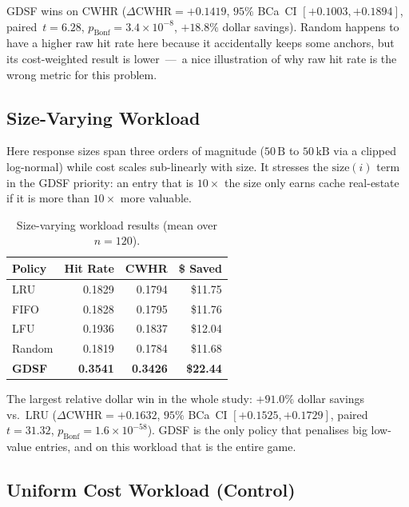 \documentclass[sigconf, nonacm, review=false, screen=true]{acmart}
\begin{document}
GDSF wins on CWHR ($\Delta\text{CWHR} = +0.1419$, $95\%$ BCa~CI
$[+0.1003, +0.1894]$, paired~$t = 6.28$,
$p_{\text{Bonf}} = 3.4\!\times\!10^{-8}$, $+18.8\%$ dollar savings).
Random happens to have a higher raw hit rate here because it accidentally
keeps some anchors, but its cost-weighted result is lower~---~a nice
illustration of why raw hit rate is the wrong metric for this problem.

\subsection{Size-Varying Workload}
Here response sizes span three orders of magnitude ($50\,\text{B}$ to
$50\,\text{kB}$ via a clipped log-normal) while cost scales sub-linearly
with size. It stresses the $\text{size}(i)$ term in the GDSF priority: an
entry that is $10\times$ the size only earns cache real-estate if it is
more than $10\times$ more valuable.

\begin{table}[t]
  \centering
  \caption{Size-varying workload results (mean over $n=120$).}
  \label{tab:sizevar}
  \begin{tabular}{lrrr}
    \toprule
    Policy & Hit Rate & CWHR & \$ Saved \\
    \midrule
    LRU     & 0.1829 & 0.1794 & \$11.75 \\
    FIFO    & 0.1828 & 0.1795 & \$11.76 \\
    LFU     & 0.1936 & 0.1837 & \$12.04 \\
    Random  & 0.1819 & 0.1784 & \$11.68 \\
    \textbf{GDSF} & \textbf{0.3541} & \textbf{0.3426} & \textbf{\$22.44} \\
    \bottomrule
  \end{tabular}
\end{table}

The largest relative dollar win in the whole study:
$+91.0\%$ dollar savings vs.\ LRU ($\Delta\text{CWHR} = +0.1632$,
$95\%$ BCa~CI $[+0.1525, +0.1729]$, paired~$t = 31.32$,
$p_{\text{Bonf}} = 1.6\!\times\!10^{-58}$). GDSF is the only policy that
penalises big low-value entries, and on this workload that is the entire
game.

\subsection{Uniform Cost Workload (Control)}
\end{document}

